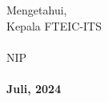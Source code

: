 \vspace{\fill}

\begin{center}
  Mengetahui,\\
  Kepala \department{} FTEIC-ITS\\
  \vspace{10ex}
  \underline{\headofdepartment{}}\\
  NIP \headofdepartmentnip{}\\
  \vspace{10ex}
  \textbf{\place{}} \\
  \textbf{Juli, 2024}
\end{center}
\endgroup
